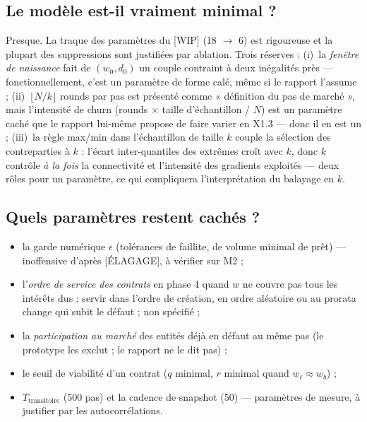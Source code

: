 \documentclass[11pt,a4paper]{article}
\begin{document}
\subsection{Le modèle est-il vraiment minimal ?}
Presque. La traque des paramètres du [WIP] (18 $\to$ 6) est rigoureuse et la
plupart des suppressions sont justifiées par ablation. Trois réserves :
(i)~la \emph{fenêtre de naissance} fait de $(w_0, d_0)$ un couple contraint à
deux inégalités près — fonctionnellement, c'est un paramètre de forme calé,
même si le rapport l'assume ; (ii)~$\lfloor N/k \rfloor$ rounds par pas est
présenté comme « définition du pas de marché », mais l'intensité de churn
(rounds $\times$ taille d'échantillon / $N$) est un paramètre caché que le
rapport lui-même propose de faire varier en X1.3 — donc il en est un ;
(iii)~la règle max/min dans l'échantillon de taille $k$ couple la sélection
des contreparties à $k$ : l'écart inter-quantiles des extrêmes croît avec
$k$, donc $k$ contrôle \emph{à la fois} la connectivité et l'intensité des
gradients exploités — deux rôles pour un paramètre, ce qui compliquera
l'interprétation du balayage en $k$.

\subsection{Quels paramètres restent cachés ?}
\begin{itemize}[nosep]
\item la garde numérique $\epsilon$ (tolérances de faillite, de volume
  minimal de prêt) — inoffensive d'après [ÉLAGAGE], à vérifier sur M2 ;
\item l'\emph{ordre de service des contrats} en phase 4 quand $w$ ne couvre
  pas tous les intérêts dus : servir dans l'ordre de création, en ordre
  aléatoire ou au prorata change qui subit le défaut ; non spécifié ;
\item la \emph{participation au marché} des entités déjà en défaut au même
  pas (le prototype les exclut ; le rapport ne le dit pas) ;
\item le seuil de viabilité d'un contrat ($q$ minimal, $r$ minimal quand
  $w_\ell \approx w_b$) ;
\item $T_{\mathrm{transitoire}}$ (500 pas) et la cadence de snapshot (50) —
  paramètres de mesure, à justifier par les autocorrélations.
\end{itemize}
\end{document}
